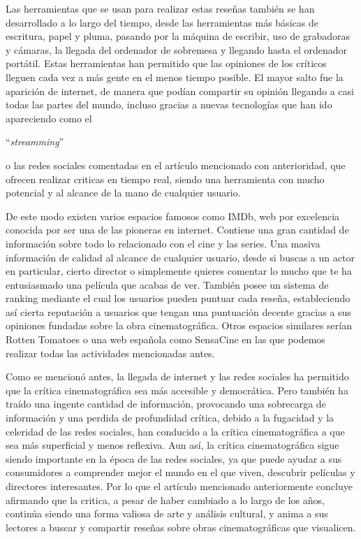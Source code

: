Las  herramientas que se usan para realizar estas reseñas también se han desarrollado a lo largo del
tiempo, desde las herramientas más básicas de escritura, papel y pluma, pasando por la máquina de 
escribir, uso de grabadoras y cámaras, la llegada del ordenador de sobremesa y llegando hasta el ordenador 
portátil. Estas herramientas han permitido que las opiniones de los críticos lleguen cada vez a más gente 
en el menos tiempo posible. El mayor salto fue la aparición de internet, de manera que podían compartir su 
opinión llegando a casi todas las partes del mundo, incluso gracias a nuevas tecnologías que han ido 
apareciendo como el \begin{otherlanguage}{english}``\textit{streamming}''\end{otherlanguage} o las redes 
sociales comentadas en el artículo mencionado con anterioridad, que ofrecen realizar criticas en tiempo 
real, siendo una herramienta con mucho potencial y al alcance de la mano de cualquier usuario.

De este modo existen varios espacios famosos como IMDb\cite{IMDbWeb}, web por excelencia conocida por ser
una de las pioneras en internet. Contiene una gran cantidad de información sobre todo lo relacionado con 
el cine y las series. Una masiva información de calidad al alcance de cualquier usuario, desde si buscas a 
un actor en particular, cierto director o simplemente quieres comentar lo mucho que te ha entusiasmado una 
película que acabas de ver. También posee un sistema de ranking mediante el cual los usuarios pueden 
puntuar cada reseña, estableciendo así cierta reputación a usuarios que tengan una puntuación decente 
gracias a sus opiniones fundadas sobre la obra cinematográfica. Otros espacios similares serían Rotten 
Tomatoes\cite{RottenTWeb} o una web española como SensaCine\cite{SSweb} en las que podemos realizar todas 
las actividades mencionadas antes.

Como se mencionó antes, la llegada de internet y las redes sociales ha permitido que la crítica 
cinematográfica sea más accesible y democrática. Pero también ha traído una ingente cantidad de 
información, provocando una sobrecarga de información y una perdida de profundidad crítica, debido a la 
fugacidad y la celeridad de las redes sociales, han conducido a la crítica cinematográfica a que sea más 
superficial y menos reflexiva. Aun así, la crítica cinematográfica sigue siendo importante en la época de 
las redes sociales, ya que puede ayudar a sus consumidores a comprender mejor el mundo en el que viven, 
descubrir películas y directores interesantes. Por lo que el artículo mencionado anteriormente concluye 
afirmando que la critica, a pesar de haber cambiado a lo largo de los años, continúa siendo una forma 
valiosa de arte y análisis cultural, y anima a sus lectores a buscar y compartir reseñas sobre obras 
cinematográficas que visualicen.

